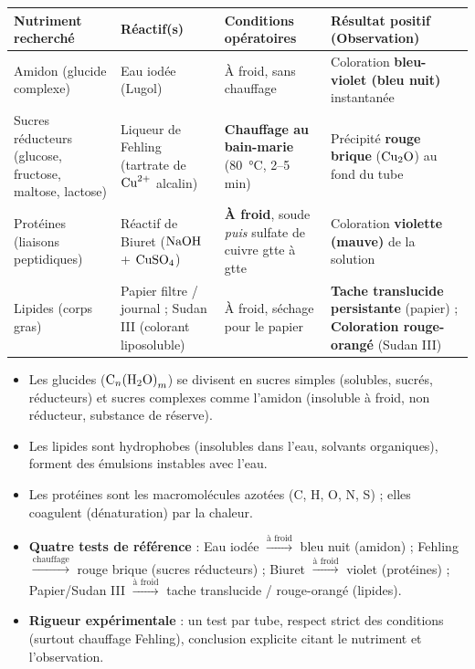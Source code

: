 \documentclass[11pt]{article}
\begin{document}
\begin{center}
\begin{tabularx}{\linewidth}{|l|X|X|X|}
\hline
\rowcolor{popblueL} \textbf{Nutriment recherché} & \textbf{Réactif(s)} & \textbf{Conditions opératoires} & \textbf{Résultat positif (Observation)} \\
\hline
Amidon (glucide complexe) & Eau iodée (Lugol) & À froid, sans chauffage & Coloration \textbf{bleu-violet (bleu nuit)} instantanée \\
\hline
Sucres réducteurs (glucose, fructose, maltose, lactose) & Liqueur de Fehling (tartrate de $\ce{Cu^2+}$ alcalin) & \textbf{Chauffage au bain-marie} (\SI{80}{\celsius}, 2--5 min) & Précipité \textbf{rouge brique} ($\ce{Cu2O}$) au fond du tube \\
\hline
Protéines (liaisons peptidiques) & Réactif de Biuret ($\ce{NaOH}$ + $\ce{CuSO4}$) & \textbf{À froid}, soude \emph{puis} sulfate de cuivre gtte à gtte & Coloration \textbf{violette (mauve)} de la solution \\
\hline
Lipides (corps gras) & Papier filtre / journal ; Sudan III (colorant liposoluble) & À froid, séchage pour le papier & \textbf{Tache translucide persistante} (papier) ; \textbf{Coloration rouge-orangé} (Sudan III) \\
\hline
\end{tabularx}
\end{center}

\begin{aretenir}
\begin{itemize}
\item Les glucides ($\ce{C}_{n}\ce{(H2O)}_{m}$) se divisent en sucres simples (solubles, sucrés, réducteurs) et sucres complexes comme l'amidon (insoluble à froid, non réducteur, substance de réserve).
\item Les lipides sont hydrophobes (insolubles dans l'eau, solvants organiques), forment des émulsions instables avec l'eau.
\item Les protéines sont les macromolécules azotées (C, H, O, N, S) ; elles coagulent (dénaturation) par la chaleur.
\item \textbf{Quatre tests de référence} : Eau iodée $\xrightarrow{\text{à froid}}$ bleu nuit (amidon) ; Fehling $\xrightarrow{\text{chauffage}}$ rouge brique (sucres réducteurs) ; Biuret $\xrightarrow{\text{à froid}}$ violet (protéines) ; Papier/Sudan III $\xrightarrow{\text{à froid}}$ tache translucide / rouge-orangé (lipides).
\item \textbf{Rigueur expérimentale} : un test par tube, respect strict des conditions (surtout chauffage Fehling), conclusion explicite citant le nutriment et l'observation.
\end{itemize}
\end{aretenir}
\end{document}
